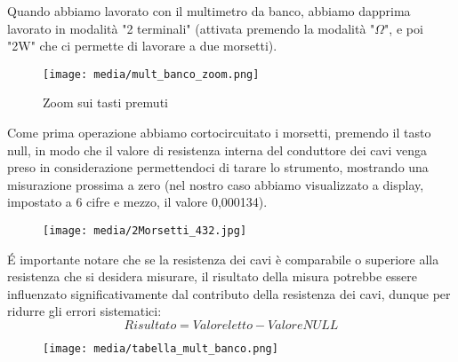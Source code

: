 Quando abbiamo lavorato con il multimetro da banco, abbiamo dapprima lavorato in modalità "2 terminali" (attivata premendo la modalità "$\Omega$", e poi "2W" che ci permette di lavorare a due morsetti).

\begin{figure}[h]
    \centering
    \texttt{[image: media/mult\_banco\_zoom.png]}
    \caption{Zoom sui tasti premuti}
    \label{fig:mult_banco_zoom}
\end{figure}

Come prima operazione abbiamo cortocircuitato i morsetti, premendo il tasto null, in modo che il valore di resistenza interna del conduttore dei cavi venga preso in considerazione permettendoci di tarare lo strumento, mostrando una misurazione prossima a zero (nel nostro caso abbiamo visualizzato a display, impostato a 6 cifre e mezzo, il valore 0,000134).


\begin{figure}[h]
    \centering
    \texttt{[image: media/2Morsetti\_432.jpg]}
    \label{fig:2morsetti}
\end{figure}

\'E importante notare che se la resistenza dei cavi è comparabile o superiore alla resistenza che si desidera misurare, il risultato della misura potrebbe essere influenzato significativamente dal contributo della resistenza dei cavi, dunque per ridurre gli errori sistematici:
\begin{equation}
    Risultato = Valore letto - Valore NULL
\end{equation}

\begin{figure}[h]
    \centering
    \texttt{[image: media/tabella\_mult\_banco.png]}
    \label{fig:tab_mult_banco}
\end{figure}

